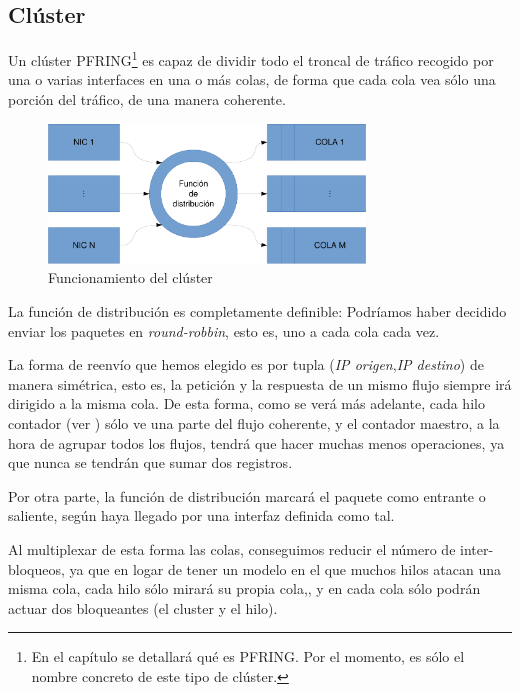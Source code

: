 \subsection{Clúster}
Un clúster \acrshort{PFRING}\footnote{En el capítulo  se detallará qué es \acrshort{PFRING}. Por el 
momento, es sólo el nombre concreto de este tipo de clúster.} es capaz de dividir todo el troncal de tráfico recogido 
por una o varias interfaces en una o más colas, de forma que cada cola vea sólo una porción del tráfico, de una manera 
coherente.

\begin{figure}[htbp]
\centering
\includegraphics[width=0.75\textwidth]{CapituloEstructura/Figuras/Cluster-crop}
\caption{Funcionamiento del clúster}
\end{figure}
%

La función de distribución es completamente definible: Podríamos haber decidido enviar los paquetes en 
\emph{round-robbin}, esto es, uno a cada cola cada vez.

La forma de reenvío que hemos elegido es por tupla (\emph{IP origen},\emph{IP destino}) de manera simétrica, esto es, 
la petición y la respuesta de un mismo flujo siempre irá dirigido a la misma cola. De esta forma, como se verá más 
adelante, cada hilo contador (ver ) sólo ve una parte del flujo coherente, y el contador maestro, a 
la hora de agrupar todos los flujos, tendrá que hacer muchas menos operaciones, ya que nunca se tendrán que sumar dos 
registros.

Por otra parte, la función de distribución marcará el paquete como entrante o saliente, según haya llegado por una 
interfaz definida como tal.

Al multiplexar de esta forma las colas, conseguimos reducir el número de inter-bloqueos, ya que en 
logar de tener un modelo en el que muchos hilos atacan una misma cola, cada hilo sólo mirará su propia cola,, y en cada 
cola sólo podrán actuar dos bloqueantes (el cluster y el hilo).

